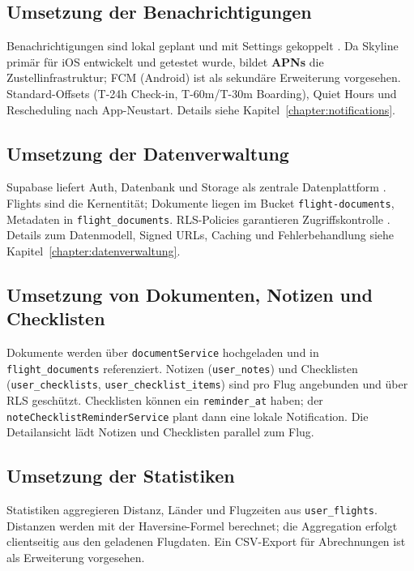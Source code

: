 \subsection{Umsetzung der Benachrichtigungen}
Benachrichtigungen sind lokal geplant und mit Settings gekoppelt
\cite{expoNotifications}. Da Skyline primär für iOS entwickelt und getestet wurde, bildet
\textbf{APNs} die Zustellinfrastruktur; FCM (Android) ist als sekundäre Erweiterung
vorgesehen. Standard-Offsets (T-24h Check-in, T-60m/T-30m Boarding), Quiet Hours
und Rescheduling nach App-Neustart. Details siehe Kapitel~\ref{chapter:notifications}.

\subsection{Umsetzung der Datenverwaltung}
Supabase liefert Auth, Datenbank und Storage als zentrale Datenplattform
\cite{supabasePlatform,supabaseAuth,supabaseStorage}. Flights sind die Kernentität;
Dokumente liegen im Bucket \texttt{flight-documents}, Metadaten in
\texttt{flight\_documents}. RLS-Policies garantieren Zugriffskontrolle
\cite{supabaseRLS}. Details zum Datenmodell, Signed URLs, Caching und Fehlerbehandlung
siehe Kapitel~\ref{chapter:datenverwaltung}.

\subsection{Umsetzung von Dokumenten, Notizen und Checklisten}
Dokumente werden über \texttt{documentService} hochgeladen und in
\texttt{flight\_documents} referenziert. Notizen (\texttt{user\_notes}) und
Checklisten (\texttt{user\_checklists}, \texttt{user\_checklist\_items}) sind
pro Flug angebunden und über RLS geschützt. Checklisten können ein
\texttt{reminder\_at} haben; der \texttt{noteChecklistReminderService} plant
dann eine lokale Notification. Die Detailansicht lädt Notizen und Checklisten
parallel zum Flug.

\subsection{Umsetzung der Statistiken}
Statistiken aggregieren Distanz, Länder und Flugzeiten aus \texttt{user\_flights}.
Distanzen werden mit der Haversine-Formel berechnet; die Aggregation erfolgt
clientseitig aus den geladenen Flugdaten. Ein CSV-Export für Abrechnungen ist als Erweiterung vorgesehen.

